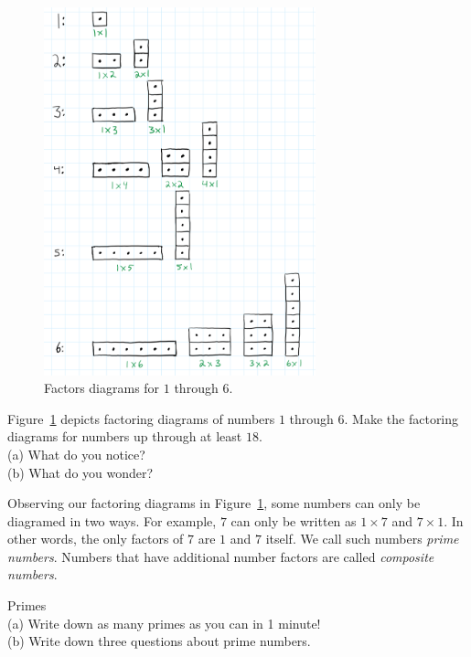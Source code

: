 \begin{figure}[h!]
    \centering
    \includegraphics[width=0.7\textwidth]{img/number_factors.png}  
    \caption{Factors diagrams for \(1\) through \(6\).}
    \label{fig:number-factors}
\end{figure}
\begin{exercise}
	Figure~\ref{fig:number-factors} depicts factoring diagrams of numbers \(1\) through \(6\).  
	Make the factoring diagrams for numbers up through at least \(18\).  
	\\ \hspace*{15mm}(a) What do you notice?
	\\ \hspace*{15mm}(b) What do you wonder? 
\end{exercise}



\newpage 
Observing our factoring diagrams in Figure~\ref{fig:number-factors}, some numbers can only be diagramed in two ways.  For example, \(7\) can only be written as \(1 \times 7\) and \(7 \times 1\).  In other words, the only factors of \(7\) are \(1\) and \(7\) itself.  We call such numbers \emph{prime numbers}.  Numbers that have additional number factors are called \emph{composite numbers}.   

\begin{exercise}
	Primes
	\\ \hspace*{15mm} (a) Write down as many primes as you can in 1 minute!
	\\ \hspace*{15mm} (b) Write down three questions about prime numbers. 
\end{exercise}

